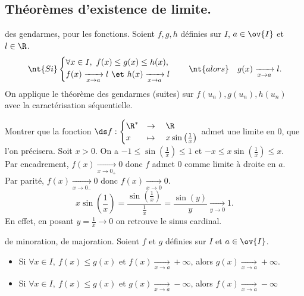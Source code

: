 \documentclass[11pt]{article}
\begin{document}
\subsection{Théorèmes d'existence de limite.}

\begin{thm}{des gendarmes, pour les fonctions.}{}
    Soient $f,g,h$ définies sur $I$, $a\in\ov{I}$ et $l\in\R$.
    \begin{equation*}
        \nt{Si } \begin{cases}
            \forall x \in I, ~ f(x) \leq g(x) \leq h(x),\\
            f(x) \xrightarrow[x\to a]{}l ~\et~ h(x)\xrightarrow[x\to a]{}l
        \end{cases} \quad \nt{alors} \quad g(x)\xrightarrow[x\to a]{}l.
    \end{equation*} 
    \tcblower
    On applique le théorème des gendarmes (suites) sur $f(u_n),g(u_n),h(u_n)$ avec la caractérisation séquentielle.
\end{thm}

\begin{ex}{}{}
    Montrer que la fonction $\ds f:\begin{cases}\R^* &\to \quad \R\\ x &\mapsto \quad x\sin\left( \frac{1}{x} \right)\end{cases}$ admet une limite en $0$, que l'on précisera.
    \tcblower
    Soit $x>0$. On a $-1\leq\sin\left( \frac{1}{x} \right)\leq1$ et $-x\leq x\sin\left( \frac{1}{x} \right)\leq x$.\\
    Par encadrement, $f(x)\xrightarrow[x\to0_+]{}0$ donc $f$ admet 0 comme limite à droite en $a$.\\
    Par parité, $f(x)\xrightarrow[x\to0_-]{}0$ donc $f(x)\xrightarrow[x\to0]{}0$.
    \begin{equation*}
        x\sin\left( \frac{1}{x} \right)=\frac{\sin\left( \frac{1}{x} \right)}{\frac{1}{x}}=\frac{\sin(y)}{y}\xrightarrow[y\to0]{}1.
    \end{equation*}
    En effet, en posant $y=\frac{1}{x}\to0$ on retrouve le sinus cardinal.
\end{ex}

\vspace*{-0.4cm}

\begin{prop}{de minoration, de majoration.}{}
    Soient $f$ et $g$ définies sur $I$ et $a\in\ov{I}$.
    \begin{itemize}
        \item Si $\forall x \in I, ~ f(x) \leq g(x)$ et $f(x)\xrightarrow[x\to a]{}+\infty$, alors $g(x)\xrightarrow[x\to a]{}+\infty$.
        \item Si $\forall x \in I, ~ f(x) \leq g(x)$ et $g(x)\xrightarrow[x\to a]{}-\infty$, alors $f(x)\xrightarrow[x\to a]{}-\infty$
    \end{itemize}
\end{prop}
\end{document}
